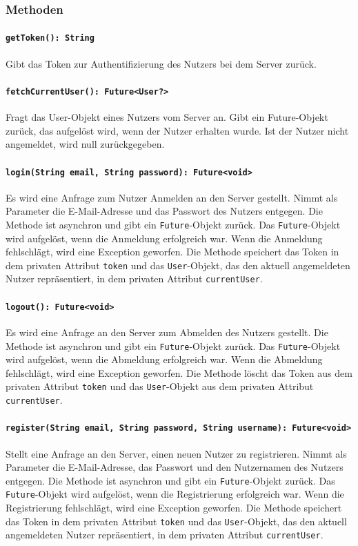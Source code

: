\documentclass{entwurfsheft}
\begin{document}
\begin{sloppypar}
\subsubsection*{Methoden}
\paragraph{\texttt{getToken(): String}}
Gibt das Token zur Authentifizierung des Nutzers bei dem Server zurück.
\paragraph{\texttt{fetchCurrentUser(): Future<User?>}}
Fragt das User-Objekt eines Nutzers vom Server an. Gibt ein Future-Objekt zurück, das aufgelöst wird, wenn der Nutzer erhalten wurde. Ist der Nutzer nicht angemeldet, wird null zurückgegeben.
\paragraph{\texttt{login(String email, String password): Future<void>}}
Es wird eine Anfrage zum Nutzer Anmelden an den Server gestellt. Nimmt als Parameter die E-Mail-Adresse und das Passwort des Nutzers entgegen. Die Methode ist asynchron und gibt ein \texttt{Future}-Objekt zurück. Das \texttt{Future}-Objekt wird aufgelöst, wenn die Anmeldung erfolgreich war. Wenn die Anmeldung fehlschlägt, wird eine Exception geworfen. Die Methode speichert das Token in dem privaten Attribut \texttt{token} und das \texttt{User}-Objekt, das den aktuell angemeldeten Nutzer repräsentiert, in dem privaten Attribut \texttt{currentUser}.
\paragraph{\texttt{logout(): Future<void>}}
Es wird eine Anfrage an den Server zum Abmelden des Nutzers gestellt. Die Methode ist asynchron und gibt ein \texttt{Future}-Objekt zurück. Das \texttt{Future}-Objekt wird aufgelöst, wenn die Abmeldung erfolgreich war. Wenn die Abmeldung fehlschlägt, wird eine Exception geworfen. Die Methode löscht das Token aus dem privaten Attribut \texttt{token} und das \texttt{User}-Objekt aus dem privaten Attribut \texttt{currentUser}.
\paragraph{\texttt{register(String email, String password, String username): Future<void>}}
Stellt eine Anfrage an den Server, einen neuen Nutzer zu registrieren. Nimmt als Parameter die E-Mail-Adresse, das Passwort und den Nutzernamen des Nutzers entgegen. Die Methode ist asynchron und gibt ein \texttt{Future}-Objekt zurück. Das \texttt{Future}-Objekt wird aufgelöst, wenn die Registrierung erfolgreich war. Wenn die Registrierung fehlschlägt, wird eine Exception geworfen. Die Methode speichert das Token in dem privaten Attribut \texttt{token} und das \texttt{User}-Objekt, das den aktuell angemeldeten Nutzer repräsentiert, in dem privaten Attribut \texttt{currentUser}.

\end{sloppypar}
\end{document}
